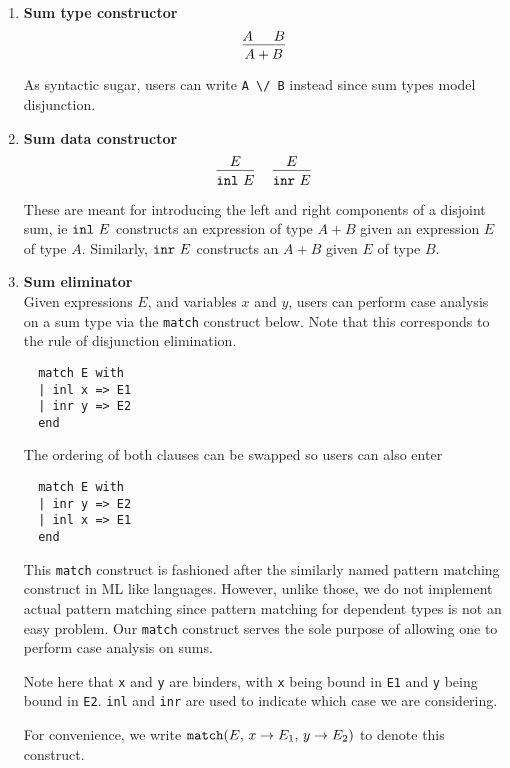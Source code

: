 \documentclass{article}
\begin{document}
\begin{enumerate}
\item \textbf{Sum type constructor} \\
\[
  \begin{prooftree}
    \hypo{A}
    \hypo{B}
    \infer2{A + B}
  \end{prooftree}
\]

As syntactic sugar, users can write \verb|A \/ B| instead since sum types
model disjunction.

\item \textbf{Sum data constructor} \\
\begin{gather*}
  \begin{prooftree}
    \hypo{E}
    \infer1{\inl \,\, E}
  \end{prooftree}
~ \quad
  \begin{prooftree}
    \hypo{E}
    \infer1{\inr \,\, E}
  \end{prooftree}
\end{gather*}

These are meant for introducing the left and right components of a disjoint sum,
ie $\texttt{inl} \,\, E$ constructs an expression of type $A + B$ given an expression $E$ of
type $A$. Similarly, $\texttt{inr} \,\, E$ constructs an $A + B$ given $E$ of type $B$.

\item \textbf{Sum eliminator} \\
Given expressions $E$, and variables $x$ and $y$, users can perform case analysis
on a sum type via the \verb|match| construct below.
Note that this corresponds to the rule of disjunction elimination.

\begin{verbatim}
  match E with
  | inl x => E1
  | inr y => E2
  end
\end{verbatim}

The ordering of both clauses can be swapped so users can also enter
\begin{verbatim}
  match E with
  | inr y => E2
  | inl x => E1
  end
\end{verbatim}

This \verb|match| construct is fashioned after the similarly named pattern
matching construct in ML like languages.
However, unlike those, we do not implement actual pattern matching since pattern
matching for dependent types is not an easy problem.
Our \verb|match| construct serves the sole purpose of allowing one to perform
case analysis on sums.

Note here that \verb|x| and \verb|y| are binders, with \verb|x| being bound in
\verb|E1| and \verb|y| being bound in \verb|E2|.
\verb|inl| and \verb|inr| are used to indicate which case we are
considering.

For convenience, we write 
$\texttt{match}(E, \, x \rightarrow E_1, \, y \rightarrow E_2)$ to denote this
construct.

\end{enumerate}
\end{document}
